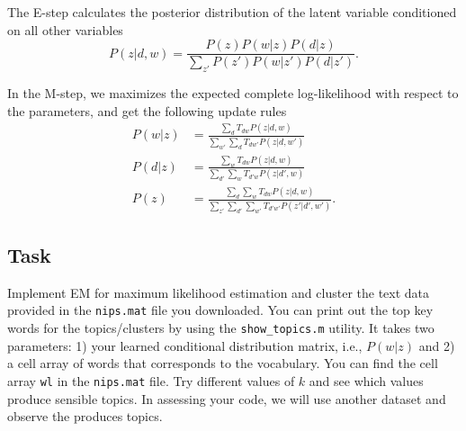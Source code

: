 \documentclass[twoside,10pt]{article}
\begin{document}
The E-step calculates the posterior distribution of the latent variable conditioned on all other variables
\begin{equation}
P(z|d, w) = \frac{P(z) P(w|z) P(d|z)}{\sum_{z'}P(z') P(w|z') P(d|z')}.
\end{equation}

In the M-step, we maximizes the expected complete log-likelihood with respect to the parameters, and get the following update rules
\begin{align}
P(w|z) &= \frac{\sum_{d} T_{dw} P(z|d,w)}{\sum_{w'}\sum_{d} T_{dw'} P(z|d,w')} \\
P(d|z) &=  \frac{\sum_{w} T_{dw} P(z|d,w)}{\sum_{d'}\sum_{w} T_{d'w} P(z|d',w)} \\
P(z) &= \frac{\sum_{d}\sum_{w} T_{dw} P(z|d,w)}{\sum_{z'}\sum_{d'}\sum_{w'} T_{d'w'} P(z'|d',w')} .
\end{align}

\subsection*{Task}
 Implement EM for maximum likelihood estimation and cluster the
text data provided in the \texttt{nips.mat} file you downloaded. You can print out the top key words for the topics/clusters 
by using the \texttt{show\_topics.m} utility. It takes two parameters: 1) your learned conditional distribution matrix, i.e., $P(w|z)$ and
2) a cell array of words that corresponds to the vocabulary. You can find the cell array \texttt{wl} in the \texttt{nips.mat} file.
Try different values of $k$ and see which values produce sensible topics. In assessing your code, we will use another dataset and 
observe the produces topics.

%
%
\end{document}
